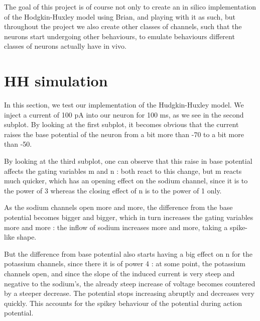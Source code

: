\documentclass[a4paper,11pt]{article} %
\begin{document}
The goal of this project is of course not only to create an in silico
implementation of the Hodgkin-Huxley model using Brian, and playing with
it as such, but throughout the project we also create other classes of
channels, such that the neurons start undergoing other behaviours, to
emulate behaviours different classes of neurons actually have in vivo.

\section{HH simulation}

In this section, we test our implementation of the Hudgkin-Huxley model.
We inject a current of 100 pA into our neuron for 100 ms, as we see in
the second subplot. By looking at the first subplot, it becomes obvious
that the current raises the base potential of the neuron from a bit
more than -70 to a bit more than -50.

By looking at the third subplot, one can observe that this raise in
base potential affects the gating variables m and n : both react to
this change, but m reacts much quicker, which has an opening effect
on the sodium channel, since it is to the power of 3 whereas the closing
effect of n is to the power of 1 only.

As the sodium channels open more and more, the difference from the
base potential becomes bigger and bigger, which in turn increases the
gating variables more and more : the inflow of sodium increases more
and more, taking a spike-like shape.

But the difference from base potential also starts having a big effect
on n for the potassium channels, since there it is of power 4 : at
some point, the potassium channels open, and since the slope of the
induced current is very steep and negative to the sodium's, the already
steep increase of voltage becomes countered by a steeper decrease.
The potential stops increasing abruptly and decreases very quickly.
This accounts for the spikey behaviour of the potential during action
potential.
\end{document}
